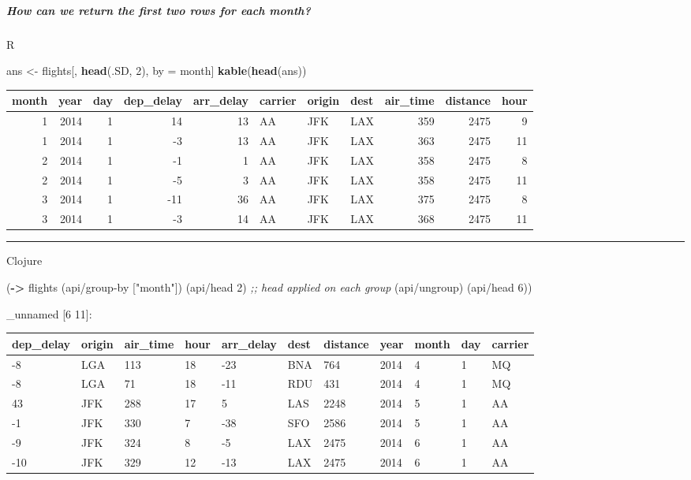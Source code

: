\documentclass[]{article}
\newenvironment{Shaded}{\begin{snugshade}}{\end{snugshade}}
\newcommand{\CommentTok}[1]{\textcolor[rgb]{0.56,0.35,0.01}{\textit{#1}}}
\newcommand{\DecValTok}[1]{\textcolor[rgb]{0.00,0.00,0.81}{#1}}
\newcommand{\KeywordTok}[1]{\textcolor[rgb]{0.13,0.29,0.53}{\textbf{#1}}}
\newcommand{\NormalTok}[1]{#1}
\newcommand{\StringTok}[1]{\textcolor[rgb]{0.31,0.60,0.02}{#1}}
\let\oldsubparagraph\subparagraph
\renewcommand{\subparagraph}[1]{\oldsubparagraph{#1}\mbox{}}
\begin{document}
\hypertarget{how-can-we-return-the-first-two-rows-for-each-month}{%
\subparagraph{How can we return the first two rows for each
month?}\label{how-can-we-return-the-first-two-rows-for-each-month}}

R

\begin{Shaded}
\begin{Highlighting}[]
\NormalTok{ans <-}\StringTok{ }\NormalTok{flights[, }\KeywordTok{head}\NormalTok{(.SD, }\DecValTok{2}\NormalTok{), by =}\StringTok{ }\NormalTok{month]}
\KeywordTok{kable}\NormalTok{(}\KeywordTok{head}\NormalTok{(ans))}
\end{Highlighting}
\end{Shaded}

\begin{longtable}[]{@{}rrrrrlllrrr@{}}
\toprule
month & year & day & dep\_delay & arr\_delay & carrier & origin & dest &
air\_time & distance & hour\tabularnewline
\midrule
\endhead
1 & 2014 & 1 & 14 & 13 & AA & JFK & LAX & 359 & 2475 & 9\tabularnewline
1 & 2014 & 1 & -3 & 13 & AA & JFK & LAX & 363 & 2475 & 11\tabularnewline
2 & 2014 & 1 & -1 & 1 & AA & JFK & LAX & 358 & 2475 & 8\tabularnewline
2 & 2014 & 1 & -5 & 3 & AA & JFK & LAX & 358 & 2475 & 11\tabularnewline
3 & 2014 & 1 & -11 & 36 & AA & JFK & LAX & 375 & 2475 & 8\tabularnewline
3 & 2014 & 1 & -3 & 14 & AA & JFK & LAX & 368 & 2475 & 11\tabularnewline
\bottomrule
\end{longtable}

\begin{center}\rule{0.5\linewidth}{0.5pt}\end{center}

Clojure

\begin{Shaded}
\begin{Highlighting}[]
\NormalTok{(}\KeywordTok{->}\NormalTok{ flights}
\NormalTok{    (api/group-by [}\StringTok{"month"}\NormalTok{])}
\NormalTok{    (api/head }\DecValTok{2}\NormalTok{) }\CommentTok{;; head applied on each group}
\NormalTok{    (api/ungroup)}
\NormalTok{    (api/head }\DecValTok{6}\NormalTok{))}
\end{Highlighting}
\end{Shaded}

\_unnamed {[}6 11{]}:

\begin{longtable}[]{@{}lllllllllll@{}}
\toprule
dep\_delay & origin & air\_time & hour & arr\_delay & dest & distance &
year & month & day & carrier\tabularnewline
\midrule
\endhead
-8 & LGA & 113 & 18 & -23 & BNA & 764 & 2014 & 4 & 1 & MQ\tabularnewline
-8 & LGA & 71 & 18 & -11 & RDU & 431 & 2014 & 4 & 1 & MQ\tabularnewline
43 & JFK & 288 & 17 & 5 & LAS & 2248 & 2014 & 5 & 1 & AA\tabularnewline
-1 & JFK & 330 & 7 & -38 & SFO & 2586 & 2014 & 5 & 1 & AA\tabularnewline
-9 & JFK & 324 & 8 & -5 & LAX & 2475 & 2014 & 6 & 1 & AA\tabularnewline
-10 & JFK & 329 & 12 & -13 & LAX & 2475 & 2014 & 6 & 1 &
AA\tabularnewline
\bottomrule
\end{longtable}
\end{document}
